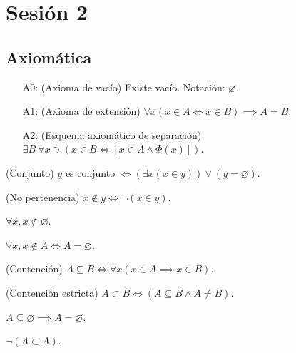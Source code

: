 \section{Sesión 2}

\subsection{Axiomática}

\begin{enumerate}
	\item[A0:] (Axioma de vacío) Existe vacío. Notación: $\varnothing$.
	\item[A1:] (Axioma de extensión) $\forall x (x\in A \iff x\in B)\implies A =B$. 
	\item[A2:] (Esquema axiomático de separación) $\exists B\ \forall x \ni (x\in B\iff [x\in A\wedge \Phi(x)])$.
\end{enumerate}

\begin{definicion}(Conjunto)
	$y$ es conjunto $\iff(\exists x(x\in y))\vee (y=\varnothing)$. 
\end{definicion}

\begin{definicion}(No pertenencia)
	$x\not\in y \iff \neg (x\in y)$. 
\end{definicion}

\begin{teorema}
	$\forall x,x\not\in \varnothing$. 
\end{teorema}

\begin{teorema}
	$\forall x, x\not\in A \iff A=\varnothing$. 
\end{teorema}

\begin{definicion}(Contención)
	$A\subseteq B\iff \forall x(x\in A\implies x\in B)$. 
\end{definicion}

\begin{definicion}(Contención estricta)
	$A \subset B\iff(A\subseteq B\wedge A\neq B)$.
\end{definicion}

\begin{teorema}
	$A\subseteq \varnothing\implies A = \varnothing$. 
\end{teorema}

\begin{teorema}
	$\neg (A\subset A)$. 
\end{teorema}


